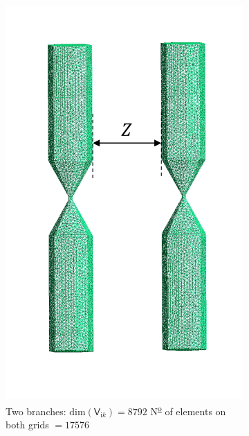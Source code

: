 \begin{figure}[H]
    \begin{subfigure}{0.3\linewidth}
        \centering
        \includegraphics[scale = 0.4]{figures/2branches}
        \caption{Two branches: $\text{dim}(\mathsf{V}_{\mathrm{i}k}) = 8792$ \newline N\textsuperscript{\underline{o}} of elements on both grids $ = 17576$}
        \end{subfigure}
        \begin{subfigure}{0.3\linewidth}
            \centering

\end{subfigure}
\end{figure}

